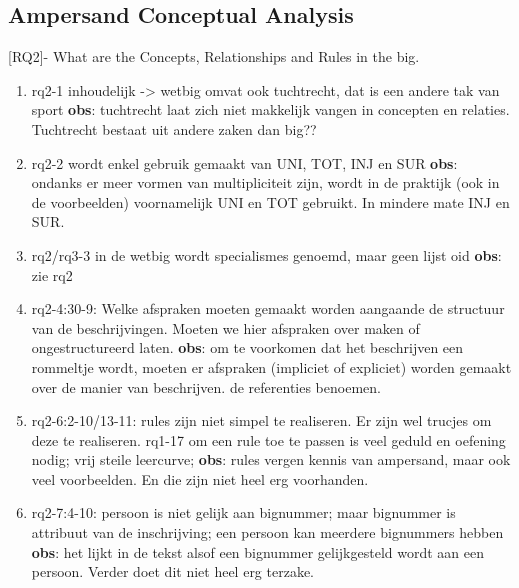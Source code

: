 \def\rq{rq2}



\subsection{Ampersand Conceptual Analysis}
[RQ2]- What are the Concepts, Relationships and Rules in the \acrshort{big}.
\begin{enumerate}
    \item rq2-1 inhoudelijk -> wetbig omvat ook tuchtrecht, dat is een andere tak van sport
    \newline\textbf{obs}: tuchtrecht laat zich niet makkelijk vangen in concepten en relaties. 
    Tuchtrecht bestaat uit andere zaken dan big??
     
    \item rq2-2 wordt enkel gebruik gemaakt van UNI, TOT, INJ en SUR
    \newline\textbf{obs}: ondanks er meer vormen van multipliciteit zijn, wordt in de praktijk (ook in de voorbeelden) voornamelijk UNI en TOT gebruikt. In mindere mate INJ en SUR. 
     
    \item rq2/rq3-3 in de wetbig wordt specialismes genoemd, maar geen lijst oid
    \newline\textbf{obs}: zie rq2
     
    \item rq2-4:30-9: Welke afspraken moeten gemaakt worden aangaande de structuur van de beschrijvingen. 
    Moeten we hier afspraken over maken of ongestructureerd laten.
    \newline\textbf{obs}: om te voorkomen dat het beschrijven een rommeltje wordt, moeten er afspraken (impliciet of expliciet) worden gemaakt over de manier van beschrijven. 
    de referenties benoemen.
    
    \item rq2-6:2-10/13-11: rules zijn niet simpel te realiseren. Er zijn wel trucjes om deze te realiseren.
    \newline rq1-17 om een rule toe te passen is veel geduld en oefening nodig; vrij steile leercurve; 
    \newline\textbf{obs}: rules vergen kennis van ampersand, maar ook veel voorbeelden. En die zijn niet heel erg voorhanden.
    
    \item rq2-7:4-10: persoon is niet gelijk aan bignummer; maar bignummer is attribuut van de inschrijving; een persoon kan meerdere bignummers hebben
    \newline\textbf{obs}: het lijkt in de tekst alsof een bignummer gelijkgesteld wordt aan een persoon. Verder doet dit niet heel erg terzake.
    

\end{enumerate}

